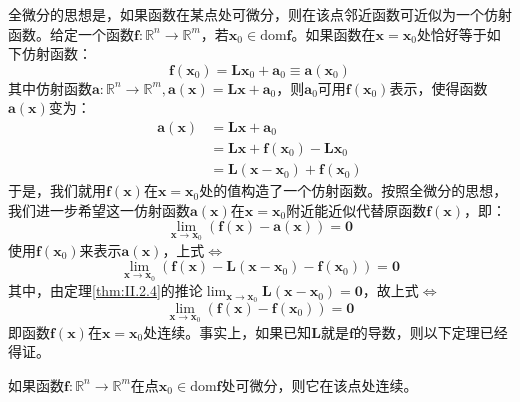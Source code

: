 \documentclass[main.tex]{subfiles}
\begin{document}
全微分的思想是，如果函数在某点处可微分，则在该点邻近函数可近似为一个仿射函数。给定一个函数$\mathbf{f}:\mathbb{R}^n\rightarrow\mathbb{R}^m$，若$\mathbf{x}_0\in\mathrm{dom}\mathbf{f}$。如果函数在$\mathbf{x}=\mathbf{x}_0$处恰好等于如下仿射函数：
\[
\mathbf{f}\left(\mathbf{x}_0\right)=\mathbf{Lx}_0+\mathbf{a}_0\equiv\mathbf{a}\left(\mathbf{x}_0\right)
\]
其中仿射函数$\mathbf{a}:\mathbb{R}^n\rightarrow\mathbb{R}^m,\mathbf{a}\left(\mathbf{x}\right)=\mathbf{Lx}+\mathbf{a}_0$，则$\mathbf{a}_0$可用$\mathbf{f}\left(\mathbf{x}_0\right)$表示，使得函数$\mathbf{a}\left(\mathbf{x}\right)$变为：
\begin{align*}
\mathbf{a}\left(\mathbf{x}\right)&=\mathbf{Lx}+\mathbf{a}_0\\
&=\mathbf{Lx}+\mathbf{f}\left(\mathbf{x}_0\right)-\mathbf{Lx}_0\\
&=\mathbf{L}\left(\mathbf{x}-\mathbf{x}_0\right)+\mathbf{f}\left(\mathbf{x}_0\right)
\end{align*}
于是，我们就用$\mathbf{f}\left(\mathbf{x}\right)$在$\mathbf{x}=\mathbf{x}_0$处的值构造了一个仿射函数。按照全微分的思想，我们进一步希望这一仿射函数$\mathbf{a}\left(\mathbf{x}\right)$在$\mathbf{x}=\mathbf{x}_0$附近能近似代替原函数$\mathbf{f}\left(\mathbf{x}\right)$，即：
\[\lim_{\mathbf{x}\to\mathbf{x}_0}\left(\mathbf{f}\left(\mathbf{x}\right)-\mathbf{a}\left(\mathbf{x}\right)\right)=\mathbf{0}\]
使用$\mathbf{f}\left(\mathbf{x}_0\right)$来表示$\mathbf{a}\left(\mathbf{x}\right)$，上式$\Leftrightarrow$
\[\lim_{\mathbf{x}\to\mathbf{x}_0}\left(\mathbf{f}\left(\mathbf{x}\right)-\mathbf{L}\left(\mathbf{x}-\mathbf{x}_0\right)-\mathbf{f}\left(\mathbf{x}_0\right)\right)=\mathbf{0}
\]
其中，由定理\ref{thm:II.2.4}的推论$\lim_{\mathbf{x}\to\mathbf{x}_0}\mathbf{L}\left(\mathbf{x}-\mathbf{x}_0\right)=\mathbf{0}$，故上式$\Leftrightarrow$
\[
\lim_{\mathbf{x}\to\mathbf{x}_0}\left(\mathbf{f}\left(\mathbf{x}\right)-\mathbf{f}\left(\mathbf{x}_0\right)\right)=\mathbf{0}
\]
即函数$\mathbf{f}\left(\mathbf{x}\right)$在$\mathbf{x}=\mathbf{x}_0$处连续。事实上，如果已知$\mathbf{L}$就是$\mathbf{f}$的导数，则以下定理已经得证。

\begin{theorem}
如果函数$\mathbf{f}:\mathbb{R}^n\rightarrow\mathbb{R}^m$在点$\mathbf{x}_0\in\mathrm{dom}\mathbf{f}$处可微分，则它在该点处连续。
\end{theorem}
\end{document}

